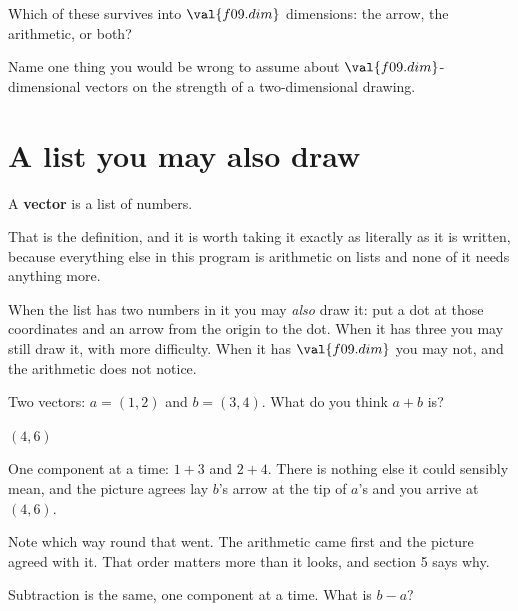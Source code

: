 \begin{quiz}
\item Which of these survives into $\val{f09.dim}$ dimensions: the arrow, the
  arithmetic, or both? 
\item Name one thing you would be wrong to assume about
  $\val{f09.dim}$-dimensional vectors on the strength of a two-dimensional
  drawing. 
\end{quiz}

\section{A list you may also draw}
\label{sec:F09-list}

\begin{fr}
A \textbf{vector} is a list of numbers.

That is the definition, and it is worth taking it exactly as literally as it
is written, because everything else in this program is arithmetic on lists and
none of it needs anything more.

When the list has two numbers in it you may \emph{also} draw it: put a dot at
those coordinates and an arrow from the origin to the dot. When it has three
you may still draw it, with more difficulty. When it has
$\val{f09.dim}$ you may not, and the arithmetic does not notice.

Two vectors: $a = (1, 2)$ and $b = (3, 4)$. What do you think $a + b$ is?
\nextframe
\end{fr}

\begin{fr}
\begin{ansblock}
$(4, 6)$
\end{ansblock}

One component at a time: $1 + 3$ and $2 + 4$. There is nothing else it could
sensibly mean, and the picture agrees \dash{} lay $b$'s arrow at the tip of
$a$'s and you arrive at $(4, 6)$.

Note which way round that went. The arithmetic came first and the picture
agreed with it. That order matters more than it looks, and section 5 says why.

Subtraction is the same, one component at a time. What is $b - a$?
\nextframe
\end{fr}

